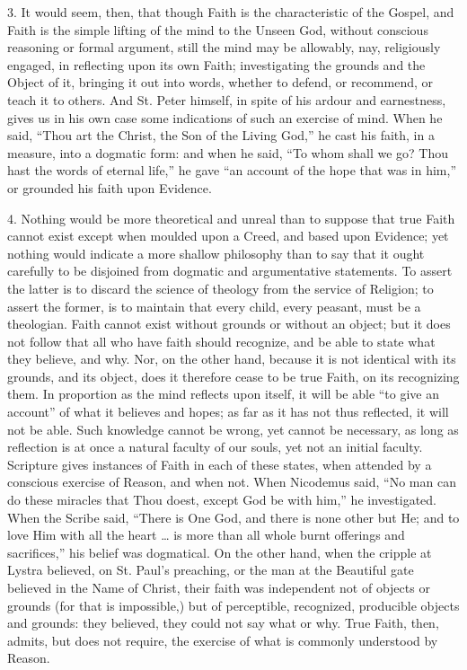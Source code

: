 3. It would seem, then, that though Faith is the characteristic of
the Gospel, and Faith is the simple lifting of the mind to the Unseen
God, without conscious reasoning or formal argument, still the mind
may be allowably, nay, religiously engaged, in reflecting upon its own
Faith; investigating the grounds and the Object of it, bringing it out
into words, whether to defend, or recommend, or teach it to others.
And St. Peter himself, in spite of his ardour and earnestness, gives
us in his own case some indications of such an exercise of mind. When
he said, ``Thou art the Christ, the Son of the Living God,''
he cast his faith, in a measure, into a dogmatic form: and when he
said, ``To whom shall we go? Thou hast the words of eternal
life,'' he gave ``an account of the hope that was in
him,'' or grounded his faith upon Evidence.

4. Nothing would be more theoretical and unreal than to suppose
that true Faith cannot exist except when moulded upon a Creed, and
based upon Evidence; yet nothing would indicate a more shallow
philosophy than to say that it ought carefully to be disjoined from
dogmatic and argumentative statements. To assert the latter is to
discard the science of theology from the service of Religion; to
assert the former, is to maintain that every child, every peasant,
must be a theologian. Faith cannot exist without grounds or without an
object; but it does not follow that all who have faith should
recognize, and be able to state what they believe, and why. Nor, on
the other hand, because it is not identical with its grounds, and its
object, does it therefore cease to be true Faith, on its recognizing
them. In proportion as the mind reflects upon itself, it will be able
``to give an account'' of what it believes and hopes; as far
as it has not thus reflected, it will not be able. Such knowledge
cannot be wrong, yet cannot be necessary, as long as reflection is at
once a natural faculty of our souls, yet not an initial faculty.
Scripture gives instances of Faith in each of these states, when
attended by a conscious exercise of Reason, and when not. When
Nicodemus said, ``No man can do these miracles that Thou doest,
except God be with him,'' he investigated. When the Scribe said,
``There is One God, and there is none other but He; and to love
Him with all the heart … is more than all whole burnt offerings and
sacrifices,'' his belief was dogmatical. On the other hand, when
the cripple at Lystra believed, on St. Paul's preaching, or the man at
the Beautiful gate believed in the Name of Christ, their faith was
independent not of objects or grounds (for that is impossible,) but of
perceptible, recognized, producible objects and grounds: they
believed, they could not say what or why. True Faith, then, admits,
but does not require, the exercise of what is commonly understood by
Reason.


